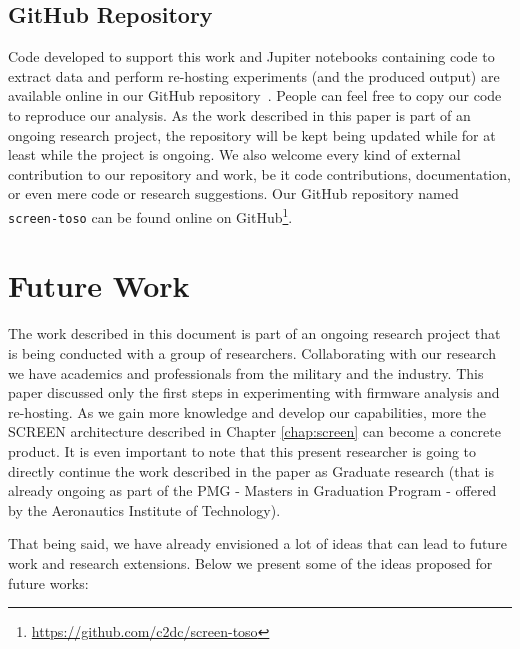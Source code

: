 \subsection{GitHub Repository}
Code developed to support this work and Jupiter notebooks containing code to extract data and perform re-hosting experiments (and the produced output) are available online in our GitHub repository~\cite{github:c2dc-toso}. People can feel free to copy our code to reproduce our analysis. As the work described in this paper is part of an ongoing research project, the repository will be kept being updated while for at least while the project is ongoing. We also welcome every kind of external contribution to our repository and work, be it code contributions, documentation, or even mere code or research suggestions. Our GitHub repository named {\tt screen-toso} can be found online on GitHub\footnote{\url{https://github.com/c2dc/screen-toso}}.

\section{Future Work}
\label{sec:future-work}

The work described in this document is part of an ongoing research project that is being conducted with a group of researchers. Collaborating with our research we have academics and professionals from the military and the industry. This paper discussed only the first steps in experimenting with firmware analysis and re-hosting. As we gain more knowledge and develop our capabilities, more the SCREEN architecture described in Chapter \ref{chap:screen} can become a concrete product. It is even important to note that this present researcher is going to directly continue the work described in the paper as Graduate research (that is already ongoing as part of the PMG - Masters in Graduation Program - offered by the Aeronautics Institute of Technology).

That being said, we have already envisioned a lot of ideas that can lead to future work and research extensions. Below we present some of the ideas proposed for future works:

